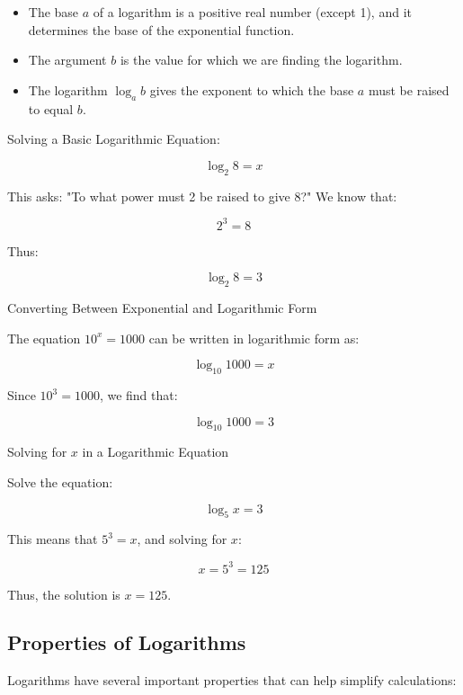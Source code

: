 \begin{itemize}
    \item The base \( a \) of a logarithm is a positive real number (except 1), and it determines the base of the exponential function.
    \item The argument \( b \) is the value for which we are finding the logarithm.
    \item The logarithm \( \log_a b \) gives the exponent to which the base \( a \) must be raised to equal \( b \).
\end{itemize}

\begin{example}
Solving a Basic Logarithmic Equation:

\[
\log_2 8 = x
\]

This asks: "To what power must 2 be raised to give 8?" We know that:

\[
2^3 = 8
\]

Thus:

\[
\log_2 8 = 3
\]

\end{example}

\begin{example}
 Converting Between Exponential and Logarithmic Form

The equation \( 10^x = 1000 \) can be written in logarithmic form as:

\[
\log_{10} 1000 = x
\]

Since \( 10^3 = 1000 \), we find that:

\[
\log_{10} 1000 = 3
\]

\end{example}


\begin{example}
Solving for \( x \) in a Logarithmic Equation
\end{example}

Solve the equation:

\[
\log_5 x = 3
\]

This means that \( 5^3 = x \), and solving for \( x \):

\[
x = 5^3 = 125
\]

Thus, the solution is \( x = 125 \).

\subsection{Properties of Logarithms}

Logarithms have several important properties that can help simplify calculations:

